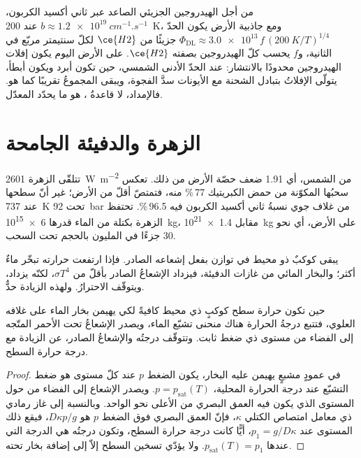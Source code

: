 من أجل الهيدروجين الجزيئي الصاعد عبر ثاني أكسيد الكربون، $b \approx
\qty{1.2e19}{cm^{-1}.s^{-1}}$ عند \qty{200}{K}، ومع
جاذبية الأرض يكون الحدّ $\Phi_\mathrm{DL} \approx
\num{3.0e13}\,f\,(\qty{200}{K}/T)^{1/4}$ جزيئًا من $\ce{H2}$ لكلّ
سنتيمتر مربّع في الثانية، و$f$ يحسب كلّ الهيدروجين بصفته $\ce{H2}$. على
الأرض اليوم يكون إفلات الهيدروجين محدودًا بالانتشار: عند
الحدّ الأدنى الشمسي، حين تكون  أبرد ويكون  أبطأ،
يتولّى الإفلاتُ بتبادل الشحنة مع الأيونات سدَّ الفجوة، ويبقى
المجموعُ تقريبًا كما هو. فالإمداد، لا
قاعدةُ ، هو ما يحدّد المعدّل.

\section{الزهرة والدفيئة الجامحة}\label{sec:b3:planetary-atmospheres:venus}

تتلقّى الزهرة \qty{2601}{W.m^{-2}} من الشمس، أي 1.91 ضعف حصّة الأرض
من ذلك. تعكس سحبُها المكوّنة من حمض الكبريتيك 77\,\% منه، فتمتصّ
أقلّ من الأرض؛ غير أنّ سطحها عند \qty{737}{K} تحت \qty{92}{bar}
من غلاف جوي نسبةُ ثاني أكسيد الكربون فيه 96.5\,\%. تحتفظ الزهرة بكتلة من الماء قدرها \qty{6e15}{kg}،
مقابل \qty{1.4e21}{kg} على الأرض، أي نحو 30 جزءًا في المليون
بالحجم تحت السحب.

يبقى كوكبٌ ذو محيط في توازن بفعل إشعاعه الصادر. فإذا
ارتفعت حرارته تبخّر ماءٌ أكثر؛ والبخار المائي من غازات الدفيئة، فيزداد
الإشعاعُ الصادر بأقلّ من $\sigma T^4$، لكنّه يزداد، ويتوقّف
الاحترارُ. ولهذه الزيادة حدٌّ.

\begin{proposition}\label{prop:b3:planetary-atmospheres:limit}
حين تكون حرارة سطح كوكبٍ ذي محيط كافيةً لكي يهيمن بخار الماء
على غلافه العلوي، فتتبع درجةُ الحرارة هناك منحنى تشبّع الماء،
ويصدر الإشعاعُ تحت الأحمر المتّجه إلى الفضاء من مستوى
ذي ضغط ثابت. وتتوقّف درجتُه والإشعاعُ الصادر،
عن الزيادة مع درجة حرارة السطح.
\end{proposition}

\begin{proof}
في عمودٍ مشبعٍ يهيمن عليه البخار، يكون الضغط $p$ عند كلّ
مستوى هو ضغط التشبّع عند درجة الحرارة المحلية، $p =
p_\mathrm{sat}(T)$. ويصدر الإشعاع إلى الفضاء من حول المستوى
الذي يكون فيه العمق البصري من الأعلى نحو الواحد. وبالنسبة إلى غاز رمادي ذي معامل امتصاص
الكتلي $\kappa$، فإنّ العمق البصري فوق الضغط $p$
هو $D\kappa p/g$، فيقع ذلك المستوى عند $p_1 = g/D\kappa$، أيًّا كانت
درجة حرارة السطح، وتكون درجتُه هي الدرجة التي عندها
$p_\mathrm{sat}(T) = p_1$. ولا يؤدّي تسخين السطح إلاّ إلى إضافة بخار تحته.
\end{proof}

